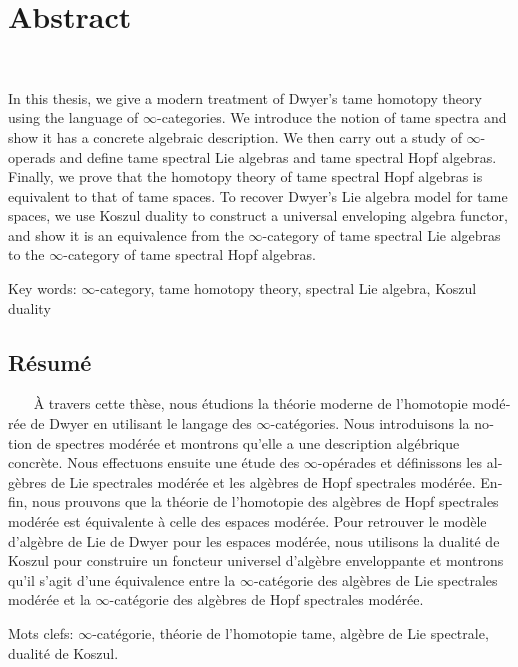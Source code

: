 

\cleardoublepage
\chapter*{Abstract}
~\newline~\newline~
In this thesis, we give a modern treatment of Dwyer's tame homotopy theory using the language of $\infty$-categories.
We introduce the notion of tame spectra and show it has a concrete algebraic description.
We then carry out a study of $\infty$-operads and define tame spectral Lie algebras and tame spectral Hopf algebras. 
Finally, we prove that the homotopy theory of tame spectral Hopf algebras is equivalent to that of tame spaces. To recover Dwyer's Lie algebra model for tame spaces, we use Koszul duality to construct a universal enveloping algebra functor, and show it is an equivalence from the $\infty$-category of tame spectral Lie algebras to the $\infty$-category of tame spectral Hopf algebras.



\vskip0.5cm
Key words: $\infty$-category, tame homotopy theory, spectral Lie algebra, Koszul duality





\begin{otherlanguage}{french}
\cleardoublepage
\chapter*{Résumé}
~\newline~\newline~
À travers cette thèse, nous étudions la théorie moderne de l’homotopie modérée de Dwyer en utilisant le langage des $\infty$-catégories.
Nous introduisons la notion de spectres modérée et montrons qu'elle a une description algébrique concrète.
Nous effectuons ensuite une étude des $\infty$-opérades et définissons les algèbres de Lie spectrales modérée et les algèbres de Hopf spectrales modérée. 
Enfin, nous prouvons que la théorie de l'homotopie des algèbres de Hopf spectrales modérée est équivalente à celle des espaces modérée. Pour retrouver le modèle d'algèbre de Lie de Dwyer pour les espaces modérée, nous utilisons la dualité de Koszul pour construire un foncteur universel d'algèbre enveloppante et montrons qu'il s'agit d'une équivalence entre la $\infty$-catégorie des algèbres de Lie spectrales modérée et la $\infty$-catégorie des algèbres de Hopf spectrales modérée.


\vskip0.5cm
Mots clefs: $\infty$-catégorie, théorie de l'homotopie tame, algèbre de Lie spectrale, dualité de Koszul.
\end{otherlanguage}



